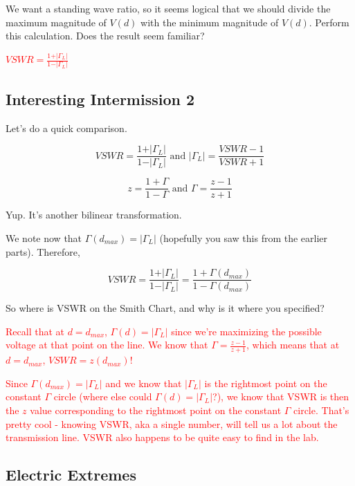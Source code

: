 \documentclass{article}
\begin{document}
We want a standing wave ratio, so it seems logical that we should divide the maximum magnitude of $V(d)$ with the minimum magnitude of $V(d)$. Perform this calculation. Does the result seem familiar?
 
\textcolor{red}{$VSWR = \frac{1 + \vert \Gamma_L \vert}{1 - \vert \Gamma_L \vert}$}

\vfill

\subsection{Interesting Intermission 2}

Let's do a quick comparison.

$$VSWR = \frac{1 + \vert \Gamma_L \vert}{1 - \vert \Gamma_L \vert} \text{ and } \vert \Gamma_L \vert = \frac{VSWR - 1}{VSWR + 1}$$

$$z = \frac{1 + \Gamma}{1 - \Gamma} \text{ and } \Gamma = \frac{z - 1}{z + 1}$$

Yup. It's another bilinear transformation.

We note now that $\Gamma(d_{max}) = \vert \Gamma_L \vert$ (hopefully you saw this from the earlier parts). Therefore,

$$VSWR = \frac{1 + \vert \Gamma_L \vert}{1 - \vert \Gamma_L \vert} = \frac{1 + \Gamma(d_{max})}{1 - \Gamma(d_{max})}$$

So where is VSWR on the Smith Chart, and why is it where you specified?

\textcolor{red}{Recall that at $d = d_{max}$, $\Gamma(d) = \vert \Gamma_L \vert$ since we're maximizing the possible voltage at that point on the line. We know that $\Gamma = \frac{z-1}{z+1}$, which means that at $d = d_{max}$, $VSWR = z(d_{max})$!}

\textcolor{red}{Since $\Gamma(d_{max}) = \vert \Gamma_L \vert$ and we know that $\vert \Gamma_L \vert$ is the rightmost point on the constant $\Gamma$ circle (where else could $\Gamma(d) = \vert \Gamma_L \vert$?), we know that VSWR is then the $z$ value corresponding to the rightmost point on the constant $\Gamma$ circle. That's pretty cool - knowing VSWR, aka a single number, will tell us a lot about the transmission line. VSWR also happens to be quite easy to find in the lab.}

\vfill

\subsection{Electric Extremes}
\end{document}
